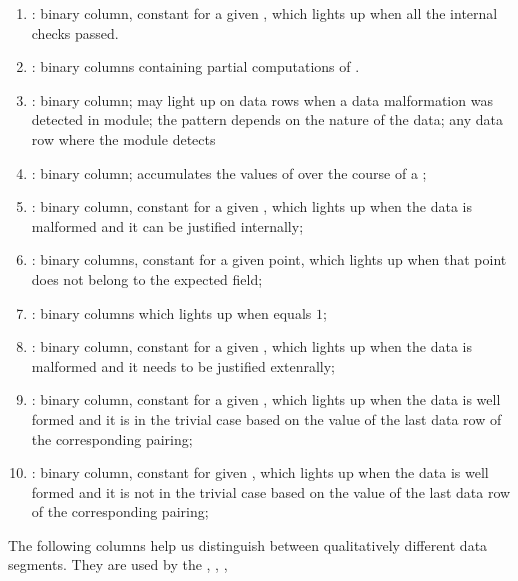 \begin{enumerate}[resume]
    \item
        \both{\internalChecksPassed}:
             binary column, constant for a given \blsId, which lights up when all the internal checks passed.
    \item
        \both{\partialChecks}:
        binary columns containing partial computations of \malformedDataInternalTot{}.
    \item
        \both{\malformedDataInternalBit}:
        binary column;
        may light up on data rows when a data malformation was detected in module;
        the pattern depends on the nature of the data;
        any data row where the module detects
    \item
        \both{\malformedDataInternalAcc}:
        binary column;
        accumulates the values of \malformedDataInternalBit{} over the course of a \blsId{};
    \item
        \both{\malformedDataInternalTot}:
        binary column, constant for a given \blsId{},
        which lights up when the data is malformed and it can be justified internally;
    \item
        \both{\malformedDataExternalBit} \blsPrediction{}:
        binary columns, constant for a given point, which lights up when that point does not belong to the expected field; %
    \item
        \both{\malformedDataExternalAcc}:
        binary columns which lights up when \malformedDataExternalBit{} equals $1$;
    \item
        \both{\malformedDataExternalTot}:
        binary column, constant for a given \blsId, which lights up when the data is malformed and it needs to be justified extenrally;
    \item
        \both{\wellformedDataTrivial}:
        binary column, constant for a given \blsId, which lights up when the data is well formed and it is in the trivial case based on the value of the last data row of the corresponding pairing;
    \item
        \both{\wellformedDataNontrivial}:
        binary column, constant for  given \blsId, which lights up when the data is well formed and it is not in the trivial case based on the value of the last data row of the corresponding pairing;
\end{enumerate}
The following columns help us distinguish between qualitatively different data segments.
They are used by the
,
,
,
